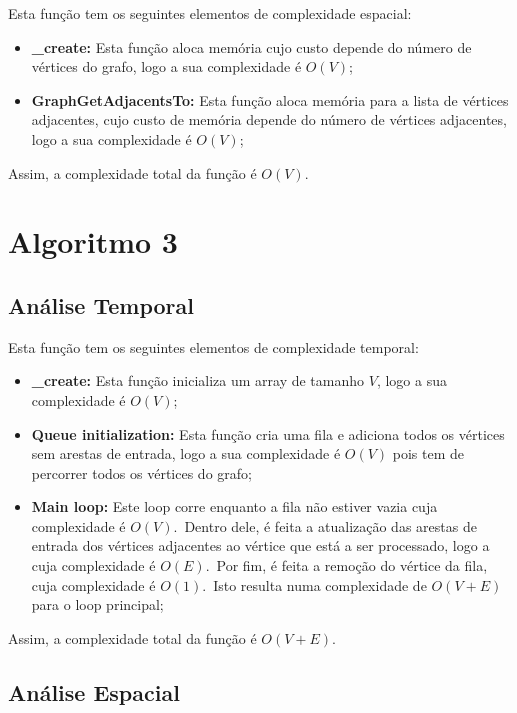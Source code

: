 Esta função tem os seguintes elementos de complexidade espacial:

\begin{itemize}
    \item \textbf{\_create:} Esta função aloca memória cujo custo depende do número de vértices do grafo, logo a sua complexidade é $O(V)$;
    \item \textbf{GraphGetAdjacentsTo:} Esta função aloca memória para a lista de vértices adjacentes, cujo custo de memória depende do número de vértices adjacentes, logo a sua complexidade é $O(V)$;
\end{itemize}

Assim, a complexidade total da função é $O(V)$.

\section{Algoritmo 3}
\label{sec:analise-formal:algoritmo-3}

\subsection{Análise Temporal}
\label{sec:analise-formal:algoritmo-3:analise-temporal}

Esta função tem os seguintes elementos de complexidade temporal:

\begin{itemize}
    \item \textbf{\_create:} Esta função inicializa um array de tamanho $V$, logo a sua complexidade é $O(V)$;
    \item \textbf{Queue initialization:} Esta função cria uma fila e adiciona todos os vértices sem arestas de entrada, logo a sua complexidade é $O(V)$ pois tem de percorrer todos os vértices do grafo;
    \item \textbf{Main loop:} Este loop corre enquanto a fila não estiver vazia cuja complexidade é $O(V)$.\ Dentro dele, é feita a atualização das arestas de entrada dos vértices adjacentes ao vértice que está a ser processado, logo a cuja complexidade é $O(E)$.\ Por fim, é feita a remoção do vértice da fila, cuja complexidade é $O(1)$.\ Isto resulta numa complexidade de $O(V + E)$ para o loop principal;
\end{itemize}

Assim, a complexidade total da função é $O(V + E)$.

\subsection{Análise Espacial}
\label{sec:analise-formal:algoritmo-3:analise-espacial}

